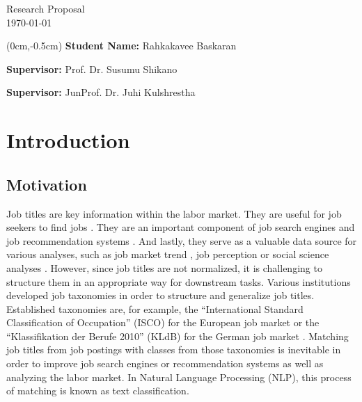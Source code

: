 \documentclass[a4paper]{article}
\begin{document}
\begin{center}  	
\Large{Research Proposal}\\
\today
\vspace{1cm}
\end{center}


\begin{textblock*}{\textwidth}(0cm,-0.5cm)
    \textbf{Student Name:} Rahkakavee Baskaran

    \textbf{Supervisor:} Prof. Dr. Susumu Shikano

    \textbf{Supervisor:} JunProf. Dr. Juhi Kulshrestha

\end{textblock*}

\medskip

\medskip

\section{Introduction}
\subsection{Motivation}
Job titles are key information within the labor market. They are useful for job seekers to find jobs \citep{Marinescu2020}. They are an important component of job search engines \citep{Slamet018, Javed2015, Javed2016} and job recommendation systems \citep{Malherbe2014}. And lastly, they serve as a valuable data source for various analyses, such as job market trend \citep{Martin2021, Li2021}, job perception \citep{Smith1989, Bodyston2019} or social science analyses \citep{Martin2021}. However, since job titles are not normalized, it is challenging to structure them in an appropriate way for downstream tasks. Various institutions developed job taxonomies in order to structure and generalize job titles. Established taxonomies are, for example, the ``International Standard Classification of Occupation'' (ISCO) for the European job market or the ``Klassifikation der Berufe 2010'' (KLdB) for the German job market \citep{Uter2020}. Matching job titles from job postings with classes from those taxonomies is inevitable in order to improve job search engines or recommendation systems as well as analyzing the labor market. In Natural Language Processing (NLP), this process of matching is known as text classification. 
\end{document}
